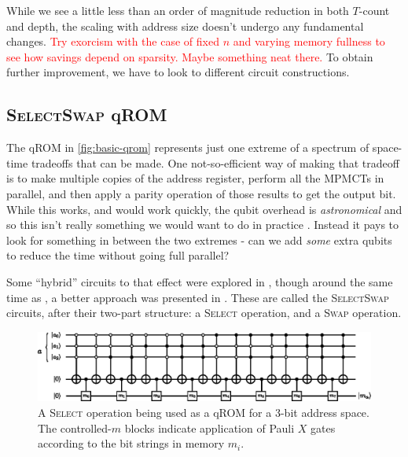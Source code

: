 \documentclass[a4paper,12pt]{article}
\newcommand\todo[1]{\textcolor{red}{#1}}
\begin{document}
While we see a little less than an order of magnitude reduction in both $T$-count and depth, the scaling with address size doesn't undergo any fundamental changes.
\todo{Try exorcism with the case of fixed $n$ and varying memory fullness to see how savings depend on sparsity. Maybe something neat there.}
To obtain further improvement, we have to look to different circuit constructions.


\subsection{\textsc{SelectSwap} qROM}

The qROM in \autoref{fig:basic-qrom} represents just one extreme of a spectrum of space-time tradeoffs that can be made. 
One not-so-efficient way of making that tradeoff is to make multiple copies of the address register, perform all the MPMCTs in parallel, and then apply a parity operation of those results to get the output bit. 
While this works, and would work quickly, the qubit overhead is \emph{astronomical} and so this isn't really something we would want to do in practice \cite{DiMatteo2020}. 
Instead it pays to look for something in between the two extremes - can we add \emph{some} extra qubits to reduce the time without going full parallel?

Some ``hybrid'' circuits to that effect were explored in \cite{DiMatteo2018, DiMatteo2020}, though around the same time as \cite{DiMatteo2018}, a better approach was presented in \cite{Vadym2018}. 
These are called the \textsc{SelectSwap} circuits, after their two-part structure: a \textsc{Select} operation, and a \textsc{Swap} operation.

\begin{figure}[ht]
 \centering
 \captionsetup{width=0.89\linewidth}
 \includegraphics[scale=1.2]{images/select-swap-only-select}
 \caption{A \textsc{Select} operation being used as a qROM for a 3-bit address space. The controlled-$m$ blocks indicate application of Pauli $X$ gates according to the bit strings in memory $m_i$.}
 \label{fig:select-swap-only-select}
\end{figure}
\end{document}
